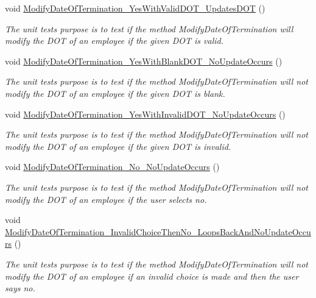 \begin{DoxyCompactItemize}
void \hyperlink{class_the_company_1_1_tests_1_1_modify_employee_tests_a3f64bd62f90c13638d9a114570d7dfcc}{Modify\+Date\+Of\+Termination\+\_\+\+Yes\+With\+Valid\+D\+O\+T\+\_\+\+Updates\+D\+O\+T} ()
\begin{DoxyCompactList}\small\item\em The unit test\textquotesingle{}s purpose is to test if the method Modify\+Date\+Of\+Termination will modify the D\+O\+T of an employee if the given D\+O\+T is valid. \end{DoxyCompactList}\item 
void \hyperlink{class_the_company_1_1_tests_1_1_modify_employee_tests_a4340e090bcc848407d7924af287a1f8c}{Modify\+Date\+Of\+Termination\+\_\+\+Yes\+With\+Blank\+D\+O\+T\+\_\+\+No\+Update\+Occurs} ()
\begin{DoxyCompactList}\small\item\em The unit test\textquotesingle{}s purpose is to test if the method Modify\+Date\+Of\+Termination will not modify the D\+O\+T of an employee if the given D\+O\+T is blank. \end{DoxyCompactList}\item 
void \hyperlink{class_the_company_1_1_tests_1_1_modify_employee_tests_a8f9c5a61025f7d46dcdf55bc8d09a3f0}{Modify\+Date\+Of\+Termination\+\_\+\+Yes\+With\+Invalid\+D\+O\+T\+\_\+\+No\+Update\+Occurs} ()
\begin{DoxyCompactList}\small\item\em The unit test\textquotesingle{}s purpose is to test if the method Modify\+Date\+Of\+Termination will not modify the D\+O\+T of an employee if the given D\+O\+T is invalid. \end{DoxyCompactList}\item 
void \hyperlink{class_the_company_1_1_tests_1_1_modify_employee_tests_a298096fb4944e854ce961e112402b4b1}{Modify\+Date\+Of\+Termination\+\_\+\+No\+\_\+\+No\+Update\+Occurs} ()
\begin{DoxyCompactList}\small\item\em The unit test\textquotesingle{}s purpose is to test if the method Modify\+Date\+Of\+Termination will not modify the D\+O\+T of an employee if the user selects no. \end{DoxyCompactList}\item 
void \hyperlink{class_the_company_1_1_tests_1_1_modify_employee_tests_a3c6470ee3f72af79cfde65ea271f8587}{Modify\+Date\+Of\+Termination\+\_\+\+Invalid\+Choice\+Then\+No\+\_\+\+Loops\+Back\+And\+No\+Update\+Occurs} ()
\begin{DoxyCompactList}\small\item\em The unit test\textquotesingle{}s purpose is to test if the method Modify\+Date\+Of\+Termination will not modify the D\+O\+T of an employee if an invalid choice is made and then the user says no. \end{DoxyCompactList}\item 

\end{DoxyCompactItemize}
